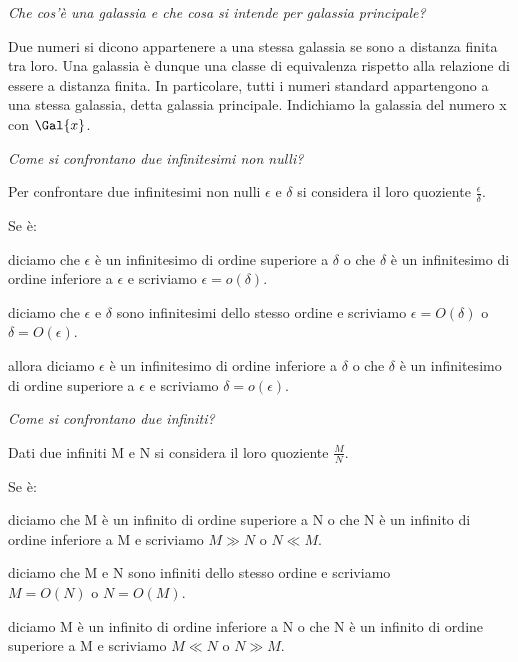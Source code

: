 \begin{esercizio}\label{ese:iper_023} 
\emph{Che cos'è una galassia e che cosa si intende per galassia 
principale?}

Due numeri si dicono appartenere a una stessa galassia se sono a distanza 
finita tra loro. Una galassia è dunque una classe di equivalenza rispetto 
alla relazione di essere a distanza finita. 
In particolare, tutti i numeri standard appartengono a una stessa galassia, 
detta galassia principale. 
Indichiamo la galassia del numero x con \(\Gal{x}\).
\end{esercizio}

\begin{esercizio}\label{ese:iper_024} 
\emph{Come si confrontano due infinitesimi non nulli?}

Per confrontare due infinitesimi non nulli \(\epsilon\) e \(\delta\) si 
considera il loro quoziente \(\frac{\epsilon}{\delta}\). 

Se è:
\begin{description} [nosep]
 \item [infinitesimo] 
diciamo che \(\epsilon\) è un infinitesimo di ordine superiore a \(\delta\) 
o che \(\delta\) è un infinitesimo di ordine inferiore a \(\epsilon\) e 
scriviamo \(\epsilon = o(\delta)\).
 \item [finito non infinitesimo] 
diciamo che \(\epsilon\) e \(\delta\) sono infinitesimi dello stesso ordine 
e scriviamo \(\epsilon = O(\delta)\) o \(\delta = O(\epsilon)\).
 \item [infinito]
allora diciamo \(\epsilon\) è un infinitesimo di ordine inferiore a 
\(\delta\) 
o che \(\delta\) è un infinitesimo di ordine superiore a \(\epsilon\) e 
scriviamo \(\delta = o(\epsilon)\).
\end{description}
\end{esercizio}

\begin{esercizio}\label{ese:iper_025} 
\emph{Come si confrontano due infiniti?}

Dati due infiniti M e N si considera il loro quoziente \(\frac{M}{N}\). 

Se è:
\begin{description} [nosep]
 \item [infinito] 
diciamo che M è un infinito di ordine superiore a N o che N è un infinito 
di ordine inferiore a M e scriviamo \(M \gg N\) o \(N \ll M\).
 \item [finito non infinitesimo] 
diciamo che M e N sono infiniti dello stesso ordine e scriviamo \\
\(M = O(N)\) o \(N = O(M)\).
 \item [infinitesimo]
diciamo M è un infinito di ordine inferiore a N o che N è un 
infinito di ordine superiore a M e scriviamo \(M \ll N\) o \(N \gg M\).
\end{description}
\end{esercizio}

